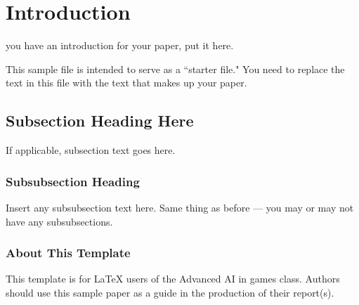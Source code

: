 \section{Introduction}
 you have an introduction for your paper, put it
here.

This sample file is intended to serve as a ``starter file."  You
need to replace the text in this file with the text that makes up
your paper.

\subsection{Subsection Heading Here}
If applicable, subsection text goes here.

\subsubsection{Subsubsection Heading}
Insert any subsubsection text here.  Same thing as before --- you may
or may not have any subsubsections.

\subsubsection{About This Template}
This template is for LaTeX users of the Advanced AI in games class.
Authors should use this sample paper as a guide in the production of
their report(s).
